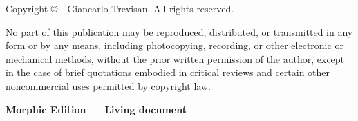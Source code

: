 \thispagestyle{empty}
\null\vfill
\noindent
\thispagestyle{empty}
\vspace*{\fill}
\begin{center}
\small
Copyright \copyright\ \the\year\ Giancarlo Trevisan. All rights reserved.

\medskip

\noindent
No part of this publication may be reproduced, distributed, or transmitted in any form or by any means, including photocopying, recording, or other electronic or mechanical methods, without the prior written permission of the author, except in the case of brief quotations embodied in critical reviews and certain other noncommercial uses permitted by copyright law.

\medskip

\noindent
\textbf{Morphic Edition — Living document}

\end{center}

\clearpage
